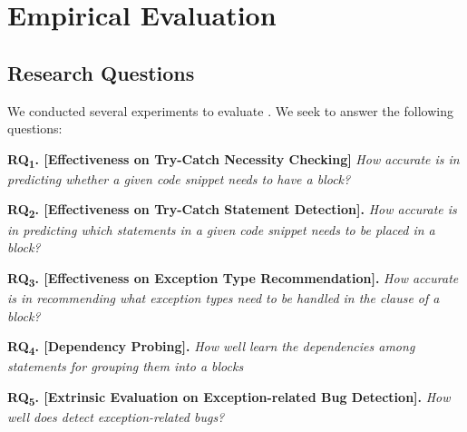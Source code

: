 \section{Empirical Evaluation}
\label{sec:eval}

\subsection{Research Questions}

We conducted several experiments to evaluate {\tool}. We seek to
answer the following questions:

\vspace{2pt}

\noindent \textbf{RQ\textsubscript{1}. [Effectiveness on Try-Catch
    Necessity Checking]} {\em How accurate is {\tool} in predicting
  whether a given code snippet needs to have a 
  block?}
    


\vspace{2pt}
\noindent \textbf{RQ\textsubscript{2}. [Effectiveness on Try-Catch
    Statement Detection].} {\em How accurate is {\tool} in predicting
  which statements in a given code snippet needs to be placed in a
   block?}


\vspace{2pt}
\noindent \textbf{RQ\textsubscript{3}. [Effectiveness on Exception Type Recommendation].}
{\em How accurate is {\tool} in recommending what exception types need to be handled in the  clause of a  block?}

\vspace{2pt}
\noindent \textbf{RQ\textsubscript{4}. [Dependency Probing].}
{\em How well {\tool} learn the dependencies among statements for grouping them into a  blocks}

\vspace{2pt}
\noindent \textbf{RQ\textsubscript{5}. [Extrinsic Evaluation on
    Exception-related Bug Detection].}  {\em How well does {\tool}
  detect exception-related bugs?}


